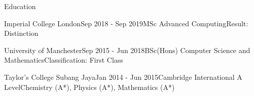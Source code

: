 \documentclass{techresume} %
\begin{document}

\begin{rSection}{Education}

\begin{rSubsection}{Imperial College London}{Sep 2018 - Sep 2019}{MSc Advanced Computing}{Result: Distinction}
\end{rSubsection}

\begin{rSubsection}{University of Manchester}{Sep 2015 - Jun 2018}{BSc(Hons) Computer Science and Mathematics}{Classification: First Class}
\end{rSubsection}

\begin{rSubsection}{Taylor's College Subang Jaya}{Jan 2014 - Jun 2015}{Cambridge International A Level}{Chemistry (A*), Physics (A*), Mathematics (A*)}
\end{rSubsection}

\end{rSection}

\end{document}
